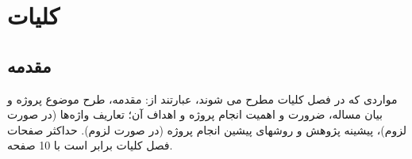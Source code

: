 \clearpage
{}
\setcounter{page}{1}

\chapter{کلیات}
\section{مقدمه}
مواردی که در فصل کلیات مطرح می شوند، عبارتند از: مقدمه، طرح موضوع پروژه و بیان مساله، ضرورت و اهميت انجام پروژه و اهداف آن؛ تعاریف واژه‌ها (در صورت لزوم)، پیشینه پژوهش و روشهای پیشین انجام پروژه (در صورت لزوم). حداکثر صفحات فصل کلیات برابر است با 10 صفحه.